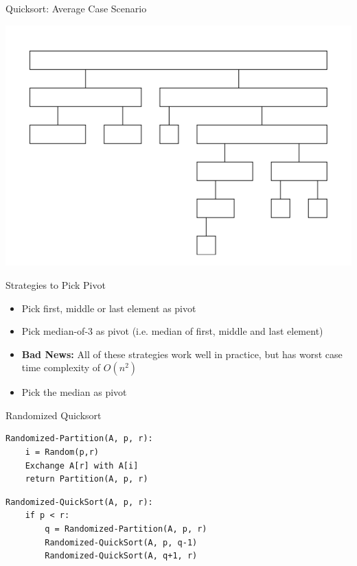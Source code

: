 \documentclass{beamer}
\begin{document}
\begin{frame}{Quicksort: Average Case Scenario}
\begin{center}
    \includegraphics[scale=0.4]{quickSortAverageCase.png}
\end{center}
\end{frame}



\begin{frame}{Strategies to Pick Pivot}
\begin{itemize}
\item Pick first, middle or last element as pivot
\item Pick median-of-3 as pivot (i.e. median of first, middle and last element)
\item {\bf Bad News:} All of these strategies work well in practice, but has worst case time complexity of $O(n^2)$ 
\item Pick the median as pivot
\end{itemize}
\end{frame}



\begin{frame}[fragile]{Randomized Quicksort}
\begin{verbatim}
Randomized-Partition(A, p, r):
    i = Random(p,r)
    Exchange A[r] with A[i]
    return Partition(A, p, r)
\end{verbatim}

\begin{verbatim}
Randomized-QuickSort(A, p, r):
    if p < r:
        q = Randomized-Partition(A, p, r)
        Randomized-QuickSort(A, p, q-1)
        Randomized-QuickSort(A, q+1, r)
\end{verbatim}

\end{frame}
\end{document}

